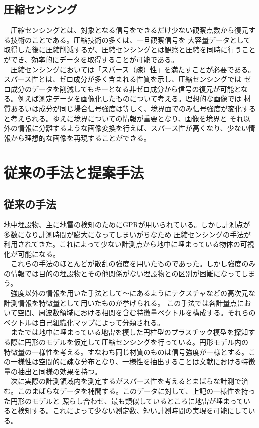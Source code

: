 \documentclass[a4paper,12pt]{jsreport}
\begin{document}
 \section{圧縮センシング}
　圧縮センシングとは、対象となる信号をできるだけ少ない観察点数から復元する技術のことである。圧縮技術の多くは、一旦観察信号を
大容量データとして取得した後に圧縮削減するが、圧縮センシングとは観察と圧縮を同時に行うことができ、効率的にデータを取得することが可能である。
\\　圧縮センシングにおいては「スパース（疎）性」を満たすことが必要である。スパース性とは、ゼロ成分が多く含まれる性質を示し、圧縮センシングでは
ゼロ成分のデータを削減してもキーとなる非ゼロ成分から信号の復元が可能となる。例えば測定データを画像化したものについて考える。理想的な画像では
材質あるいは成分が同じ場合信号強度は等しく、境界面でのみ信号強度が変化すると考えられる。ゆえに境界についての情報が重要となり、画像を境界と
それ以外の情報に分離するような画像変換を行えば、スパース性が高くなり、少ない情報から理想的な画像を再現することができる。


\chapter{従来の手法と提案手法}
\section{従来の手法}
地中埋設物、主に地雷の検知のためにGPRが用いられている。しかし計測点が多数になり計測時間が膨大になってしまいがちなため
圧縮センシングの手法が利用されてきた。これによって少ない計測点から地中に埋まっている物体の可視化が可能になる。
\\　これらの手法のほとんどが散乱の強度を用いたものであった。しかし強度のみの情報では目的の埋設物とその他関係がない埋設物との区別が困難になってしまう。
\\　強度以外の情報を用いた手法として\cite{hirose1}～\cite{hirose3}にあるようにテクスチャなどの高次元な計測情報を特徴量として用いたものが挙げられる。
この手法では各計量点において空間、周波数領域における相関を含む特徴量ベクトルを構成する。それらのベクトルは自己組織化マップによって分類される。
\\　また\cite{imai}では地中に埋まっている地雷を模した円柱型のプラスチック模型を探知する際に円形のモデルを仮定して圧縮センシングを行っている。円形モデル内の
特徴量の一様性を考える。すなわち同じ材質のものは信号強度が一様とする。この一様性は空間的に疎な分布となり、一様性を抽出することは文献\cite{hirose2}における特徴量の抽出と同様の効果を持つ。
\\　次に実際の計測領域内を測定するがスパース性を考えるとまばらな計測で済む。このまばらなデータを補間する。このデータに対して、上記の一様性を持った円形のモデルと
照らし合わせ、最も類似しているところに地雷が埋まっていると検知する。これによって少ない測定数、短い計測時間の実現を可能にしている。
\end{document}
